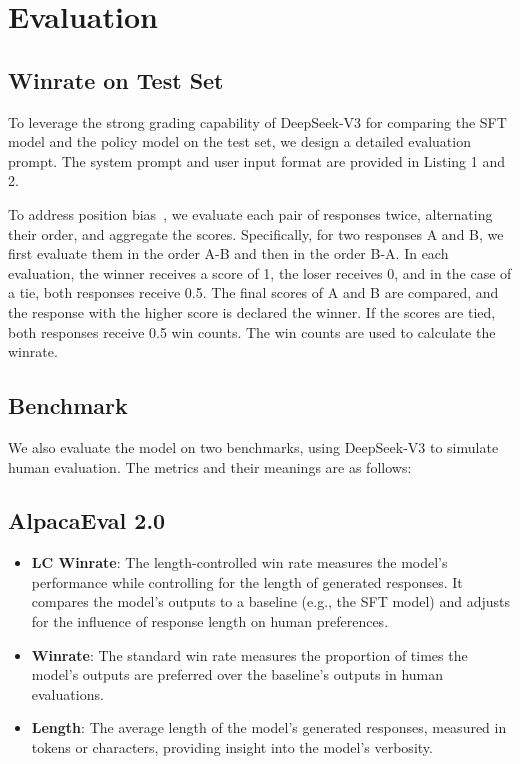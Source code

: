 \section{Evaluation}
\subsection{Winrate on Test Set}
To leverage the strong grading capability of DeepSeek-V3 for comparing the SFT model and the policy model on the test set, we design a detailed evaluation prompt. The system prompt and user input format are provided in Listing 1 and 2.

To address position bias~\cite{wang2023largelanguagemodelsfair}, we evaluate each pair of responses twice, alternating their order, and aggregate the scores. Specifically, for two responses A and B, we first evaluate them in the order A-B and then in the order B-A. In each evaluation, the winner receives a score of 1, the loser receives 0, and in the case of a tie, both responses receive 0.5. The final scores of A and B are compared, and the response with the higher score is declared the winner. If the scores are tied, both responses receive 0.5 win counts. The win counts are used to calculate the winrate.

% 
\subsection{Benchmark}
We also evaluate the model on two benchmarks, using DeepSeek-V3 to simulate human evaluation. The metrics and their meanings are as follows:
\subsection*{AlpacaEval 2.0}
\begin{itemize}[leftmargin=*, itemsep=0pt]
    \item \textbf{LC Winrate}: The length-controlled win rate measures the model's performance while controlling for the length of generated responses. It compares the model's outputs to a baseline (e.g., the SFT model) and adjusts for the influence of response length on human preferences.
    \item \textbf{Winrate}: The standard win rate measures the proportion of times the model's outputs are preferred over the baseline's outputs in human evaluations.
    \item \textbf{Length}: The average length of the model's generated responses, measured in tokens or characters, providing insight into the model's verbosity.
\end{itemize}

